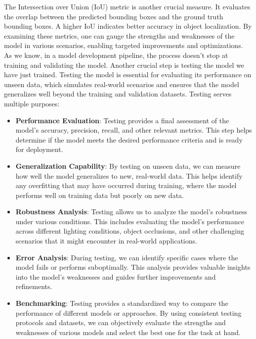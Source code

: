 \documentclass[../main]{subfiles}
\begin{document}
The Intersection over Union (IoU) metric is another crucial measure. It evaluates the overlap between the predicted bounding boxes and the ground truth bounding boxes. A higher IoU indicates better accuracy in object localization. By examining these metrics, one can gauge the strengths and weaknesses of the model in various scenarios, enabling targeted improvements and optimizations. As we know, in a model development pipeline, the process doesn't stop at training and validating the model. Another crucial step is testing the model we have just trained. Testing the model is essential for evaluating its performance on unseen data, which simulates real-world scenarios and ensures that the model generalizes well beyond the training and validation datasets. Testing serves multiple purposes:

\begin{itemize}
    \item[\textbullet] \textbf{Performance Evaluation}: Testing provides a final assessment of the model's accuracy, precision, recall, and other relevant metrics. This step helps determine if the model meets the desired performance criteria and is ready for deployment.
    \item[\textbullet] \textbf{Generalization Capability}: By testing on unseen data, we can measure how well the model generalizes to new, real-world data. This helps identify any overfitting that may have occurred during training, where the model performs well on training data but poorly on new data.
    \item[\textbullet] \textbf{Robustness Analysis}: Testing allows us to analyze the model's robustness under various conditions. This includes evaluating the model's performance across different lighting conditions, object occlusions, and other challenging scenarios that it might encounter in real-world applications.
    \item[\textbullet] \textbf{Error Analysis}: During testing, we can identify specific cases where the model fails or performs suboptimally. This analysis provides valuable insights into the model's weaknesses and guides further improvements and refinements.
    \item[\textbullet] \textbf{Benchmarking}: Testing provides a standardized way to compare the performance of different models or approaches. By using consistent testing protocols and datasets, we can objectively evaluate the strengths and weaknesses of various models and select the best one for the task at hand.
\end{itemize}
\end{document}
